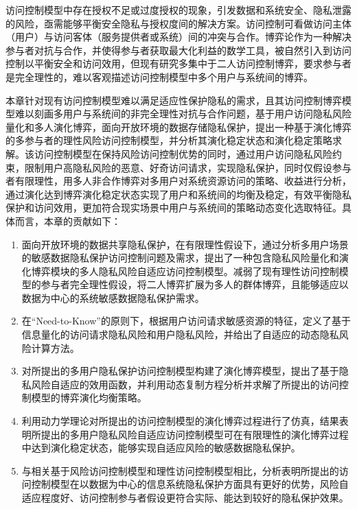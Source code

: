 访问控制模型中存在授权不足或过度授权的现象，引发数据和系统安全、隐私泄露的风险，亟需能够平衡安全隐私与授权度间的解决方案。访问控制可看做访问主体（用户）与访问客体（服务提供者或系统）间的冲突与合作。博弈论\cite{owen2001game}作为一种解决参与者对抗与合作，并使得参与者获取最大化利益的数学工具，被自然引入到访问控制以平衡安全和访问效用\cite{helil2017non,gao2018game,wang2019game}，但现有研究多集中于二人访问控制博弈，要求参与者是完全理性的，难以客观描述访问控制模型中多个用户与系统间的博弈。

本章针对现有访问控制模型难以满足适应性保护隐私的需求，且其访问控制博弈模型难以刻画多用户与系统间的非完全理性对抗与合作问题，基于用户访问隐私风险量化和多人演化博弈，面向开放环境的数据存储隐私保护，提出一种基于演化博弈的多参与者的理性风险访问控制模型，并分析其演化稳定状态和演化稳定策略求解。该访问控制模型在保持风险访问控制优势的同时，通过用户访问隐私风险约束，限制用户高隐私风险的恶意、好奇访问请求，实现隐私保护，同时仅假设参与者有限理性，用多人非合作博弈对多用户对系统资源访问的策略、收益进行分析，通过演化达到博弈演化稳定状态实现了用户和系统间的均衡及稳定，有效平衡隐私保护和访问效用，更加符合现实场景中用户与系统间的策略动态变化选取特征。具体而言，本章的贡献如下：
\begin{enumerate}
	\item 面向开放环境的数据共享隐私保护，在有限理性假设下，通过分析多用户场景的敏感数据隐私保护访问控制问题及需求，提出了一种包含隐私风险量化和演化博弈模块的多人隐私风险自适应访问控制模型。减弱了现有理性访问控制模型的参与者完全理性假设，将二人博弈扩展为多人的群体博弈，且能够适应以数据为中心的系统敏感数据隐私保护需求。
	\item 在“Need-to-Know”的原则下，根据用户访问请求敏感资源的特征，定义了基于信息量化的访问请求隐私风险和用户隐私风险，并给出了自适应的动态隐私风险计算方法。
	\item 对所提出的多用户隐私保护访问控制模型构建了演化博弈模型，提出了基于隐私风险自适应的效用函数，并利用动态复制方程分析并求解了所提出的访问控制模型的博弈演化均衡策略。
	\item 利用动力学理论对所提出的访问控制模型的演化博弈过程进行了仿真，结果表明所提出的多用户隐私风险自适应访问控制模型可在有限理性的演化博弈过程中达到演化稳定状态，能够实现自适应风险的敏感数据隐私保护。
	\item 与相关基于风险访问控制模型和理性访问控制模型相比，分析表明所提出的访问控制模型在以数据为中心的信息系统隐私保护方面具有更好的优势，风险自适应程度好、访问控制参与者假设更符合实际、能达到较好的隐私保护效果。
\end{enumerate}



